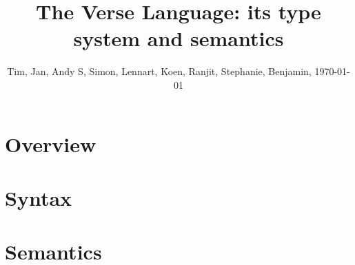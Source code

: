 \documentclass[acmsmall,screen,review,9pt]{acmart}\settopmatter{}
\begin{document}
\title{The Verse Language: its type system and semantics}
\author{Tim, Jan, Andy S, Simon, Lennart, Koen, Ranjit, Stephanie, Benjamin, \today}
\maketitle


\section{Overview}



\section{Syntax}




\section{Semantics}


\end{document}
